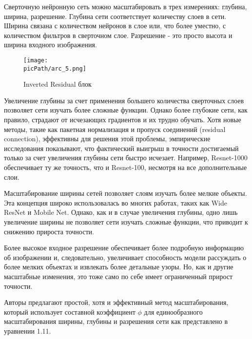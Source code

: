\documentclass[oneside,final,12pt]{extreport}
\newcommand{\picPath}{images}
\begin{document}
Сверточную нейронную сеть можно масштабировать в трех измерениях: глубина, ширина, разрешение. Глубина сети соответствует количеству слоев в сети. Ширина связана с количеством нейронов в слое или, что более уместно, с количеством фильтров в сверточном слое. Разрешение - это просто высота и ширина входного изображения.

\begin{figure}[H]
\begin{center}
  \texttt{[image: \\picPath/arc\_5.png]}
  \caption{Inverted Residual блок}
  \label{fig:arc_5}
  \end{center}
\end{figure}

Увеличение глубины за счет применения большего количества сверточных слоев позволяет сети изучать более сложные функции. Однако более глубокие сети, как правило, страдают от исчезающих градиентов и их трудно обучать. Хотя новые методы, такие как пакетная нормализация и пропуск соединений (residual connection), эффективны для решения этой проблемы, эмпирические исследования показывают, что фактический выигрыш в точности достигаемый только за счет увеличения глубины сети быстро исчезает. Например, Resnet-1000 обеспечивает ту же точность, что и Resnet-100, несмотря на все дополнительные слои.

Масштабирование ширины сетей позволяет слоям изучать более мелкие объекты. Эта концепция широко использовалась во многих работах, таких как Wide ResNet и Mobile Net. Однако, как и в случае увеличения глубины, одно лишь увеличение ширины не позволяет сети изучать сложные функции, что приводит к снижению прироста точности.

Более высокое входное разрешение обеспечивает более подробную информацию об изображении и, следовательно, увеличивает способность модели рассуждать о более мелких объектах и извлекать более детальные узоры. Но, как и другие масштабные изменения, это тоже само по себе имеет ограниченный прирост точности.

Авторы предлагают простой, хотя и эффективный метод масштабирования, который использует составной коэффициент $ \phi $ для единообразного масштабирования ширины, глубины и разрешения сети как представлено в уравнении 1.11.
\end{document}
